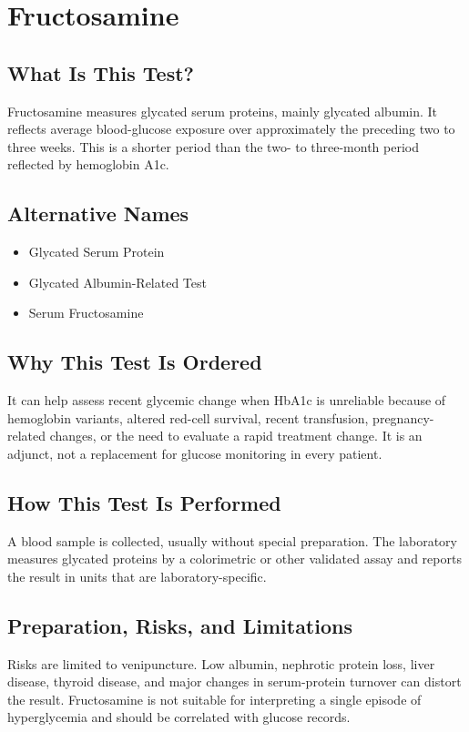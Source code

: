 \chapter{Fructosamine}

\section*{What Is This Test?}
Fructosamine measures glycated serum proteins, mainly glycated albumin. It reflects average blood-glucose exposure over approximately the preceding two to three weeks. This is a shorter period than the two- to three-month period reflected by hemoglobin A1c.

\section*{Alternative Names}
\begin{itemize}
  \item Glycated Serum Protein
  \item Glycated Albumin-Related Test
  \item Serum Fructosamine
\end{itemize}
\section*{Why This Test Is Ordered}
It can help assess recent glycemic change when HbA1c is unreliable because of hemoglobin variants, altered red-cell survival, recent transfusion, pregnancy-related changes, or the need to evaluate a rapid treatment change. It is an adjunct, not a replacement for glucose monitoring in every patient.

\section*{How This Test Is Performed}
A blood sample is collected, usually without special preparation. The laboratory measures glycated proteins by a colorimetric or other validated assay and reports the result in units that are laboratory-specific.

\section*{Preparation, Risks, and Limitations}
Risks are limited to venipuncture. Low albumin, nephrotic protein loss, liver disease, thyroid disease, and major changes in serum-protein turnover can distort the result. Fructosamine is not suitable for interpreting a single episode of hyperglycemia and should be correlated with glucose records.

